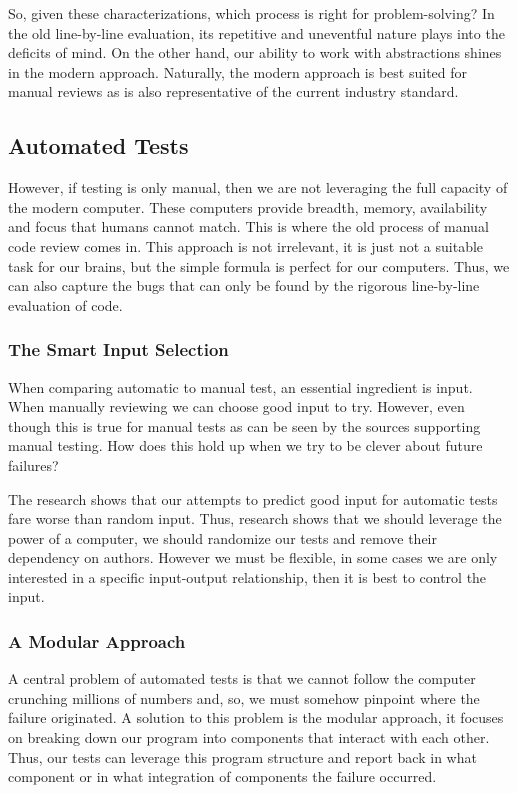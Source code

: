 \documentclass{article}
\begin{document}
So, given these characterizations, which process is right for problem-solving?
In the old line-by-line evaluation, its repetitive and uneventful nature plays into the deficits of mind.
On the other hand, our ability to work with abstractions shines in the modern approach.
Naturally, the modern approach is best suited for manual reviews as is also representative of the current industry standard.\cite{sadowski_modern_2018}

\subsection{Automated Tests}

However, if testing is only manual, then we are not leveraging the full capacity of the modern computer. 
These computers provide breadth, memory, availability and focus that humans cannot match. 
This is where the old process of manual code review comes in. \cite{cassee_silent_2020}
This approach is not irrelevant, it is just not a suitable task for our brains, but the simple formula is perfect for our computers.
Thus, we can also capture the bugs that can only be found by the rigorous line-by-line evaluation of code. 

\subsubsection{The Smart Input Selection}

When comparing automatic to manual test, an essential ingredient is input.
When manually reviewing we can choose good input to try. 
However, even though this is true for manual tests as can be seen by the sources supporting manual testing. \cite{sadowski_modern_2018} 
How does this hold up when we try to be clever about future failures?

The research shows that our attempts to predict good input for automatic tests fare worse than random input. \cite{meyer_seven_2008}
Thus, research shows that we should leverage the power of a computer, we should randomize our tests and remove their dependency on authors.
However we must be flexible, in some cases we are only interested in a specific input-output relationship, then it is best to control the input.

\subsubsection{A Modular Approach}

A central problem of automated tests is that we cannot follow the computer crunching millions of numbers and, so, we must somehow pinpoint where the failure originated.
A solution to this problem is the modular approach, it focuses on breaking down our program into components that interact with each other.
Thus, our tests can leverage this program structure and report back in what component or in what integration of components the failure occurred.
\end{document}

